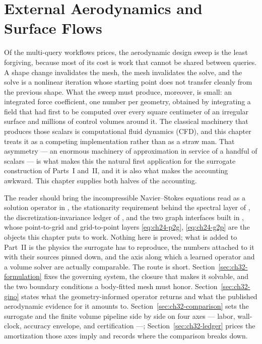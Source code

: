 
\chapter{External Aerodynamics and Surface Flows}
\label{ch:part3-external-aerodynamics-and-surface-flows}
\label{sec:aerodynamics}

Of the multi-query workflows 
prices, the aerodynamic design sweep is the least forgiving, because most of its cost is work
that cannot be shared between queries. A shape change invalidates the mesh, the mesh invalidates
the solve, and the solve is a nonlinear iteration whose starting point does not transfer
cleanly from the previous shape. 
 What the sweep must produce, moreover, is small: an integrated
force coefficient, one number per geometry, obtained by integrating a field that had first to
be computed over every square centimeter of an irregular surface and millions of control
volumes around it. The classical machinery that produces those scalars is computational fluid
dynamics (CFD), and this chapter treats it as a competing implementation rather than as a straw
man. 
That asymmetry --- an enormous machinery of approximation in service of a
handful of scalars --- is what makes this the natural first application for the surrogate
construction of Parts~I and~II, and it is also what makes the accounting awkward.
This chapter supplies both halves of the accounting.

The reader should bring the incompressible Navier--Stokes equations read as a solution
operator in , the stationarity
requirement
behind the spectral layer of , the
discretization-invariance ledger of ,
and the two graph interfaces built in ,
whose point-to-grid and grid-to-point layers \eqref{eq:ch24-p2g}, \eqref{eq:ch24-g2p} are the
objects this chapter puts to work. Nothing here is proved; what is added to Part~II is the
physics the surrogate has to reproduce, the numbers attached to it with their sources pinned
down, and the axis along which a learned operator and a volume solver are actually comparable.
The route is short. Section~\ref{sec:ch32-formulation} fixes the governing system, the closure
that makes it solvable, and the two boundary conditions a body-fitted mesh must honor.
Section~\ref{sec:ch32-gino} states what the geometry-informed operator returns and what the
published aerodynamic evidence for it amounts to. Section~\ref{sec:ch32-comparison} sets the
surrogate and the finite volume pipeline side by side on four axes --- labor, wall-clock,
accuracy envelope, and certification ---; Section~\ref{sec:ch32-ledger} prices the amortization
those axes imply and records where the comparison breaks down.

